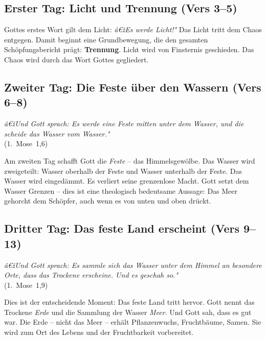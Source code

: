 ﻿\documentclass[a4paper,12pt]{article}
\theoremstyle{definition}
\begin{document}
\subsection{Erster Tag: Licht und Trennung (Vers 3--5)}

Gottes erstes Wort gilt dem Licht: \textit{â€žEs werde Licht!"} Das Licht tritt
dem Chaos entgegen. Damit beginnt eine Grundbewegung, die den gesamten
Schöpfungsbericht prägt: \textbf{Trennung}. Licht wird von Finsternis geschieden.
Das Chaos wird durch das Wort Gottes gegliedert.

\subsection{Zweiter Tag: Die Feste über den Wassern (Vers 6--8)}

\begin{displayquote}
    \textit{â€žUnd Gott sprach: Es werde eine Feste mitten unter dem Wasser, und
    die scheide das Wasser vom Wasser."}\\
    \hfill (1.~Mose~1,6)
\end{displayquote}

Am zweiten Tag schafft Gott die \textit{Feste} -- das Himmelsgewölbe. Das Wasser
wird zweigeteilt: Wasser oberhalb der Feste und Wasser unterhalb der Feste.
Das Wasser wird eingedämmt. Es verliert seine grenzenlose Macht. Gott setzt dem
Wasser Grenzen -- dies ist eine theologisch bedeutsame Aussage: Das Meer gehorcht
dem Schöpfer, auch wenn es von unten und oben drückt.

\subsection{Dritter Tag: Das feste Land erscheint (Vers 9--13)}

\begin{displayquote}
    \textit{â€žUnd Gott sprach: Es sammle sich das Wasser unter dem Himmel an
    besondere Orte, dass das Trockene erscheine. Und es geschah so."}\\
    \hfill (1.~Mose~1,9)
\end{displayquote}

Dies ist der entscheidende Moment: Das feste Land tritt hervor. Gott nennt das
Trockene \textit{Erde} und die Sammlung der Wasser \textit{Meer}. Und Gott sah,
dass es gut war. Die Erde -- nicht das Meer -- erhält Pflanzenwuchs, Fruchtbäume,
Samen. Sie wird zum Ort des Lebens und der Fruchtbarkeit vorbereitet.
\end{document}
